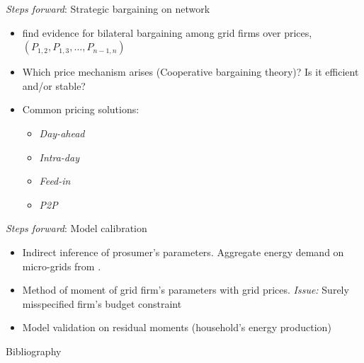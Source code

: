 \documentclass[xcolor={svgnames}]{beamer}
\begin{document}
\begin{frame}{\textit{Steps forward}: Strategic bargaining on network}
    \begin{itemize} \setlength\itemsep{1em}
        \item \citeauthor{Lopes2011} find evidence for bilateral bargaining among grid firms over prices, $(P_{1, 2}, P_{1, 3}, \ldots, P_{n-1, n})$
        \item Which price mechanism arises (Cooperative bargaining theory)? Is it efficient and/or stable?
        \item Common pricing solutions: \begin{itemize}\setlength\itemsep{0.5em}
                  \item \textit{Day-ahead}
                  \item \textit{Intra-day}
                  \item \textit{Feed-in}
                  \item \textit{P2P}
              \end{itemize}
    \end{itemize}
\end{frame}

\begin{frame}{\textit{Steps forward}: Model calibration}
    \begin{itemize}\setlength\itemsep{1em}
        \item Indirect inference of prosumer's parameters. Aggregate energy demand on micro-grids from \citeauthor{Fridgen2018}.
        \item Method of moment of grid firm's parameters with grid prices. \textit{Issue:} Surely misspecified firm's budget constraint
        \item Model validation on residual moments (household's energy production)
    \end{itemize}
\end{frame}

\endgroup


\begin{frame}[allowframebreaks]{Bibliography}
    \printbibliography
\end{frame}
\end{document}
